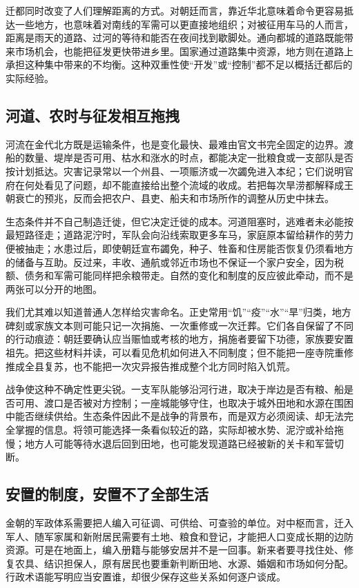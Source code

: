迁都同时改变了人们理解距离的方式。对朝廷而言，靠近华北意味着命令更容易抵达一些地方，也意味着对南线的军需可以更直接地组织；对被征用车马的人而言，距离是雨天的道路、过河的等待和能否在夜间找到歇脚处。通向都城的道路既能带来市场机会，也能把征发更快带进乡里。国家通过道路集中资源，地方则在道路上承担这种集中带来的不均衡。这种双重性使“开发”或“控制”都不足以概括迁都后的实际经验。

\subsection{河道、农时与征发相互拖拽}

河流在金代北方既是运输条件，也是变化最快、最难由官文书完全固定的边界。渡船的数量、堤岸是否可用、枯水和涨水的时点，都能决定一批粮食或一支部队是否按计划抵达。灾害记录常以一个州县、一项赈济或一次蠲免进入本纪；它们说明官府在何处看见了问题，却不能直接给出整个流域的收成。若把每次旱涝都解释成王朝衰亡的预兆，反而会把农户、县吏、船夫和市场所作的调整从历史中抹去。

生态条件并不自己制造迁徙，但它决定迁徙的成本。河道阻塞时，逃难者未必能按最短路径走；道路泥泞时，军队会向沿线索取更多车马，家庭原本留给耕作的劳力便被抽走；水患过后，即使朝廷宣布蠲免，种子、牲畜和住房能否恢复仍须看地方的储备与互助。反过来，丰收、通航或邻近市场也不保证一个家户安全，因为税额、债务和军需可能同样把余粮带走。自然的变化和制度的反应彼此牵动，而不是两张可以分开的地图。

我们尤其难以知道普通人怎样给灾害命名。正史常用“饥”“疫”“水”“旱”归类，地方碑刻或家族文本则可能只记一次捐施、一次重修或一次迁葬。它们各自保留了不同的行动痕迹：朝廷要确认应当赈恤或考核的地方，捐施者要留下功德，家族要安置祖先。把这些材料并读，可以看见危机如何进入不同制度；但不能把一座寺院重修推成全县复苏，也不能把一次灾异报告推成整个北方同时陷入饥荒。

战争使这种不确定性更尖锐。一支军队能够沿河行进，取决于岸边是否有粮、船是否可用、渡口是否被对方控制；一座城能够守住，也取决于城外田地和水源在围困中能否继续供给。生态条件因此不是战争的背景布，而是双方必须阅读、却无法完全掌握的信息。将领可能选择一条看似较近的路，实际却被水势、泥泞或补给拖慢；地方人可能等待水退后回到田地，也可能发现道路已经被新的关卡和军营切断。

\subsection{安置的制度，安置不了全部生活}

金朝的军政体系需要把人编入可征调、可供给、可查验的单位。对中枢而言，迁入军人、随军家属和新附居民需要有土地、粮食和登记，才能把人口变成长期的边防资源。可是在地面上，编入册籍与能够安居并不是一回事。新来者要寻找住处、修复农具、结识担保人，原有居民也要重新判断田地、水源、婚姻和市场如何分配。行政术语能写明应当安置谁，却很少保存这些关系如何逐户谈成。

